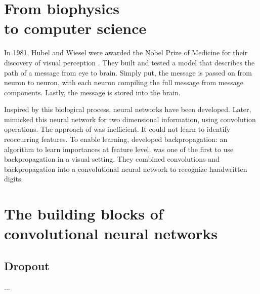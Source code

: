 
\chapter[From biophysics to computer science]{From biophysics \\ to computer science}

In 1981, Hubel and Wiesel were awarded the Nobel Prize of Medicine for their discovery of visual perception \cite{NP1981}.
They built and tested a model that describes the path of a message from eye to brain.
Simply put, the message is passed on from neuron to neuron, with each neuron compiling the full message from message components.
Lastly, the message is stored into the brain.

Inspired by this biological process, neural networks have been developed.
Later, \textcite{Fukushima1980} mimicked this neural network for two dimensional information, using convolution operations.
The approach of \citeauthor{Fukushima1980} was inefficient.
It could not learn to identify reoccurring features.
To enable learning, \textcite{Rumelhart1986} developed backpropagation: an algorithm to learn importances at feature level.
\textcite{LeCun1990} was one of the first to use backpropagation in a visual setting.
They combined convolutions and backpropagation into a convolutional neural network to recognize handwritten digits.


\chapter[CNN building blocks]{The building blocks of convolutional neural networks}

\section{Dropout}\label{sec:dropout}
...

